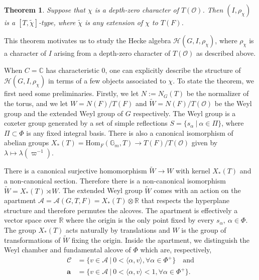 \documentclass{article}
\newcommand{\Hom}{\mathrm{Hom}}
\newcommand{\cO}{\mathcal{O}}
\newcommand{\cH}{\mathcal{H}}
\newcommand{\CC}{\mathbb{C}}
\newcommand{\RR}{\mathbb{R}}
\newcommand{\GG}{\mathbb{G}}
\theoremstyle{plain}
\newtheorem{theorem}{Theorem}[section]
\theoremstyle{definition}
\begin{document}
    \begin{theorem}
        Suppose that $\chi$ is a depth-zero character of $T(\cO)$. Then $(I,\rho_\chi)$ is a $[T,\tilde\chi]$-type, where $\tilde\chi$ is any extension of $\chi$ to $T(F)$.
    \end{theorem}

    This theorem motivates us to study the Hecke algebra $\cH(G,I,\rho_\chi)$, where $\rho_\chi$ is a character of $I$ arising from a depth-zero character of $T(\cO)$ as described above. 

    When $C=\CC$ has characteristic $0$, one can explicitly describe the structure of $\cH(G,I,\rho_{\chi})$ in terms of a few objects associated to $\chi$. To state the theorem, we first need some preliminaries. Firstly, we let $N:=N_G(T)$ be the normalizer of the torus, and we let $W=N(F)/T(F)$ and $\tilde{W}=N(F)/T(\cO)$ be the Weyl group and the extended Weyl group of $G$ respectively. The Weyl group is a coxeter group generated by a set of simple reflections $S=\{s_\alpha\ |\ \alpha\in\Pi\}$, where $\Pi\subset\Phi$ is any fixed integral basis. There is also a canonical isomorphism of abelian groups $X_*(T)=\Hom_F(\GG_m,T)\longrightarrow T(F)/T(\cO)$ given by $\lambda\mapsto\lambda(\varpi^{-1})$.
    
    There is a canonical surjective homomorphism $\tilde{W}\rightarrow W$ with kernel $X_*(T)$ and a non-canonical section. Therefore there is a non-canonical isomorphism $\tilde{W}=X_*(T)\rtimes W$. The extended Weyl group $\tilde{W}$ comes with an action on the apartment $\mathcal{A}=\mathcal{A}(G,T,F)=X_*(T)\otimes\RR$ that respects the hyperplane structure and therefore permutes the alcoves. The apartment is effectively a vector space over $\RR$ where the origin is the only point fixed by every $s_\alpha,\ \alpha\in\Phi$. The group $X_*(T)$ acts naturally by translations and $W$ is the group of transformations of $\tilde{W}$ fixing the origin. Inside the apartment, we distinguish the Weyl chamber and fundamental alcove of $\Phi$ which are, respectively,
    \begin{align*}
        \mathcal{C}&=\{v\in\mathcal{A}\ |\ 0<\langle\alpha,v\rangle,\forall\alpha\in\Phi^+\}\quad\text{and}\\
        \textbf{a}&=\{v\in\mathcal{A}\ |\ 0<\langle\alpha,v\rangle<1,\forall\alpha\in\Phi^+\}.
    \end{align*}
\end{document}
